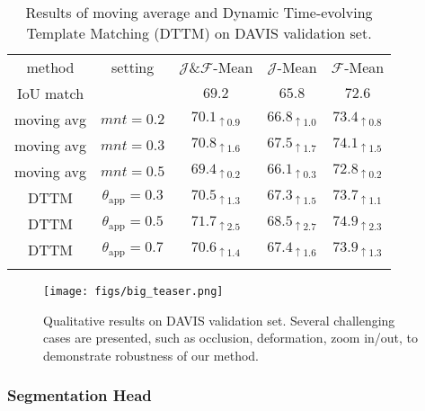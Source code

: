 \documentclass[10pt,twocolumn,letterpaper]{article}
\begin{document}
\begin{table}[]
\small
\centering
\addtolength{\tabcolsep}{-1pt}
\begin{tabular}{@{\hspace{0mm}}c|c|c@{\hspace{2mm}}c@{\hspace{2mm}}c}
\Xhline{1.0pt}
method & setting & $\mathcal{J}$\&$\mathcal{F}$-Mean & $\mathcal{J}$-Mean & $\mathcal{F}$-Mean \\
\Xhline{1.0pt}
IoU match & &$69.2$&$65.8$&$72.6$ \\
\hline
moving avg & $\mathit{mnt}=0.2$ & $70.1_{\uparrow0.9}$ & $66.8_{\uparrow1.0}$ & $73.4_{\uparrow0.8}$ \\
moving avg & $\mathit{mnt}=0.3$ & $\mathbf{70.8_{\uparrow1.6}}$ & $\mathbf{67.5_{\uparrow1.7}}$ & $\mathbf{74.1_{\uparrow1.5}}$ \\
moving avg & $\mathit{mnt}=0.5$ & $69.4_{\uparrow0.2}$ & $66.1_{\uparrow0.3}$ & $72.8_{\uparrow0.2}$\\
\hline
DTTM & $\theta_{\text{app}}=0.3$ &$70.5_{\uparrow1.3}$&$67.3_{\uparrow1.5}$&$73.7_{\uparrow1.1}$\\
DTTM & $\theta_{\text{app}}=0.5$ &$\mathbf{71.7_{\uparrow2.5}}$&$\mathbf{68.5_{\uparrow2.7}}$&$\mathbf{74.9_{\uparrow2.3}}$\\
DTTM & $\theta_{\text{app}}=0.7$ &$70.6_{\uparrow1.4}$&$67.4_{\uparrow1.6}$&$73.9_{\uparrow1.3}$\\
\Xhline{1.0pt}
\end{tabular}
\caption{Results of moving average and Dynamic Time-evolving Template Matching (DTTM) on DAVIS validation set.}
    \vspace{-1.5em}
\label{table:ablation-dtt}
\end{table}

\begin{figure*}[t]
\begin{center}
   \texttt{[image: figs/big\_teaser.png]}
\end{center}
   \caption{Qualitative results on DAVIS validation set.
   Several challenging cases are presented, such as occlusion, deformation, zoom in/out, to demonstrate robustness of our method.}
\label{fig:big-teaser}
\vspace{-0.2in}
\end{figure*}

\vspace{-10pt}
\subsubsection{Segmentation Head}
\end{document}
